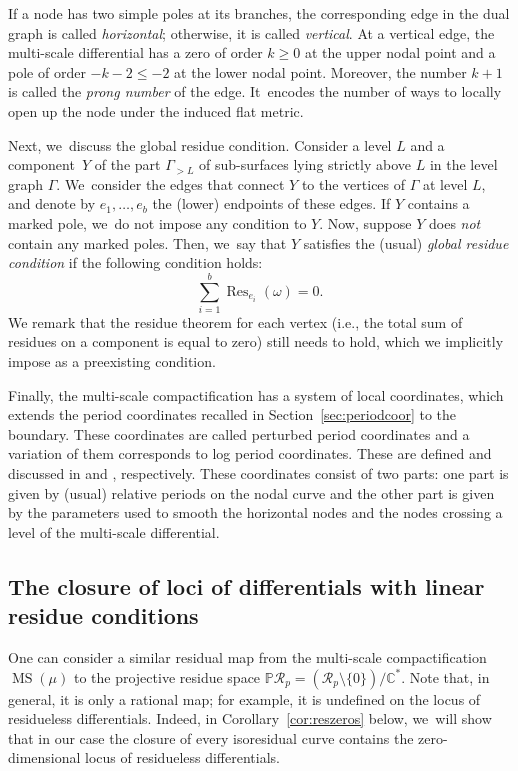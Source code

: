 \documentclass[11pt]{article}
\newcommand{\ie}{i.e.,\xspace}
\newcommand{\Subsection}{\subsection}
\DeclareMathOperator\MS{MS}
\DeclareMathOperator\Res{Res}
\theoremstyle{definition}
\begin{document}
If a node has two simple poles at its branches, the corresponding edge in the dual graph is called {\em horizontal}; otherwise, it is called {\em vertical}. At a vertical edge, the multi-scale differential has a zero of order $k\geq0$ at the upper nodal point and a pole of order $-k-2\leq-2$ at the lower nodal point.
Moreover, the number $k+1$ is called the {\em prong number} of the edge. It~encodes the number of ways to locally open up the node under the induced flat metric.

Next, we~discuss the global residue condition. Consider a level $L$ and a component~$Y$ of the part $\Gamma_{>L}$ of sub-surfaces lying strictly above $L$ in the level graph $\Gamma$. We~consider the edges that connect $Y$ to the vertices of $\Gamma$ at level $L$, and denote by $e_{1},\dots,e_{b}$ the (lower) endpoints of these edges.
If $Y$ contains a marked pole, we~do not impose any condition to $Y$. Now, suppose $Y$ does {\em not} contain any marked poles. Then, we~say that $Y$ satisfies the (usual) {\em global residue condition} if the following condition holds:\vspace*{-5pt}
\begin{equation}
\tag*{GRC}\label{GRC} \sum_{i=1}^{b}\Res_{e_{i}}(\omega) = 0.
\end{equation}
We remark that the residue theorem for each vertex (\ie the total sum of residues on a component is equal to zero) still needs to hold, which we implicitly impose as a preexisting condition.

Finally, the multi-scale compactification has a system of local coordinates, which extends the period coordinates recalled in Section~\ref{sec:periodcoor} to the boundary. These coordinates are called perturbed period coordinates and a variation of them corresponds to log period coordinates. These are defined and discussed in \cite[\S\S9.2, 13.3]{BCGGM2} and \cite[\S5]{BenBound}, respectively. These coordinates consist of two parts: one part is given by (usual) relative periods on the nodal curve and the other part is given by the parameters used to smooth the horizontal nodes and the nodes crossing a level of the multi-scale differential.\enlargethispage{\baselineskip}

\Subsection{The closure of loci of differentials with linear residue conditions}\label{sub:closure}

One can consider a similar residual map from the multi-scale compactification $\MS(\mu)$ to the projective residue space $\mathbb{P} \mathcal{R}_{p} = (\mathcal{R}_{p} \setminus \{ 0 \}) / \mathbb{C}^{*}$. Note that, in general, it is only a rational map; for example, it is undefined on the locus of residueless differentials. Indeed, in Corollary~\ref{cor:reszeros} below, we~will show that in our case the closure of every isoresidual curve contains the zero-dimensional locus of residueless differentials.
\end{document}
